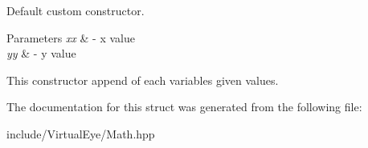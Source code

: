 Default custom constructor. 


\begin{DoxyParams}{Parameters}
{\em xx} & -\/ x value \\
\hline
{\em yy} & -\/ y value\\
\hline
\end{DoxyParams}
This constructor append of each variables given values. 

The documentation for this struct was generated from the following file\+:\begin{DoxyCompactItemize}
\item 
include/\+Virtual\+Eye/Math.\+hpp\end{DoxyCompactItemize}
